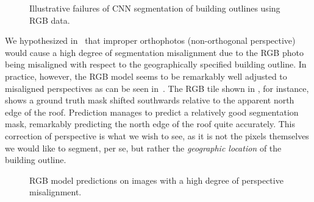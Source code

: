 \begin{figure}[H]
  \centering
  \caption{%
    Illustrative failures of CNN segmentation of building outlines using RGB data.
  }%
  \label{fig:rgb-prediction-issues}
\end{figure}

We hypothesized in~ that improper orthophotos (non-orthogonal perspective) would cause a high degree of segmentation misalignment due to the RGB photo being misaligned with respect to the geographically specified building outline.
In practice, however, the RGB model seems to be remarkably well adjusted to misaligned perspectives as can be seen in~.
The RGB tile shown in , for instance, shows a ground truth mask shifted southwards relative to the apparent north edge of the roof.
Prediction  manages to predict a relatively good segmentation mask, remarkably predicting the north edge of the roof quite accurately.
This correction of perspective is what we wish to see, as it is not the pixels themselves we would like to segment, per se, but rather the \emph{geographic location} of the building outline.

\begin{figure}[H]
  \centering
  \caption{%
    RGB model predictions on images with a high degree of perspective misalignment. \\
  }%
  \label{fig:perspective-correction}
\end{figure}
